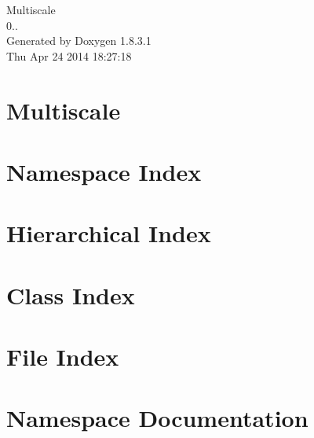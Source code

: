 \documentclass{book}
\begin{document}
\hypersetup{pageanchor=false,citecolor=blue}
\begin{titlepage}
\vspace*{7cm}
\begin{center}
{\Large Multiscale \\[1ex]\large 0.. }\\
\vspace*{1cm}
{\large Generated by Doxygen 1.8.3.1}\\
\vspace*{0.5cm}
{\small Thu Apr 24 2014 18:27:18}\\
\end{center}
\end{titlepage}
\clearemptydoublepage
{}
\tableofcontents
\clearemptydoublepage
{}
\hypersetup{pageanchor=true,citecolor=blue}
\chapter{Multiscale}
\label{index}\hypertarget{index}{}
\chapter{Namespace Index}

\chapter{Hierarchical Index}

\chapter{Class Index}

\chapter{File Index}

\chapter{Namespace Documentation}






\end{document}
